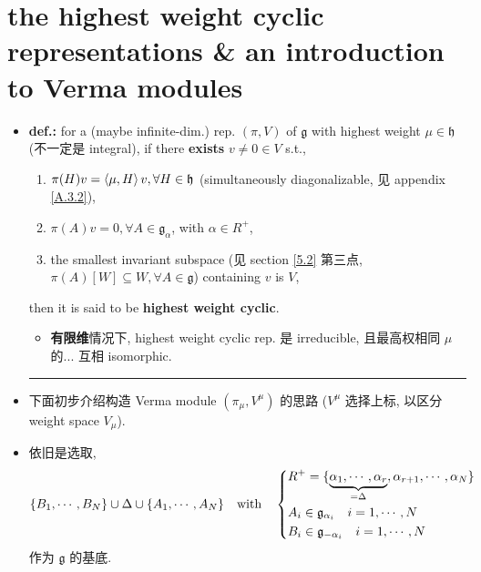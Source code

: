 \section{the highest weight cyclic representations \& an introduction to Verma modules} \label{8.2}
\begin{itemize}
	\item \textbf{def.:} for a (maybe infinite-dim.) rep. $(\pi, V)$ of $\mathfrak{g}$ with highest weight $\mu \in \mathfrak{h}$ (不一定是 integral), if there \textbf{exists} $v \neq 0 \in V$ s.t.,
	\begin{enumerate}
		\item $\pi(H) v = \braket{\mu, H} v, \forall H \in \mathfrak{h}$ (simultaneously diagonalizable, 见 appendix \ref{A.3.2}),
		
		\item $\pi(A) v = 0, \forall A \in \mathfrak{g}_\alpha$, with $\alpha \in R^+$,
		
		\item the smallest invariant subspace (见 section \ref{5.2} 第三点, $\pi(A)[W] \subseteq W, \forall A \in \mathfrak{g}$) containing $v$ is $V$,
	\end{enumerate}
	then it is said to be \textbf{highest weight cyclic}.
	
	\begin{itemize}
		\item \textbf{有限维}情况下, highest weight cyclic rep. 是 irreducible, 且最高权相同 $\mu$ 的... 互相 isomorphic.
	\end{itemize}
	
	\noindent\rule[0.5ex]{\linewidth}{0.5pt} %
	
	\item 下面初步介绍构造 Verma module $(\pi_\mu, V^\mu)$ 的思路 ($V^\mu$ 选择上标, 以区分 weight space $V_\mu$).
	
	\item 依旧是选取,
	\begin{equation}
		\{B_1, \cdots, B_N\} \cup \Delta \cup \{A_1, \cdots, A_N\} \quad \text{with} \quad \begin{dcases}
			R^+ = \{\underbrace{\alpha_1, \cdots, \alpha_r}_{= \Delta}, \alpha_{r + 1}, \cdots, \alpha_N\} \\
			A_i \in \mathfrak{g}_{\alpha_i} \quad i = 1, \cdots, N \\
			B_i \in \mathfrak{g}_{- \alpha_i} \quad i = 1, \cdots, N
		\end{dcases}
	\end{equation}
	作为 $\mathfrak{g}$ 的基底.
	

\end{itemize}
